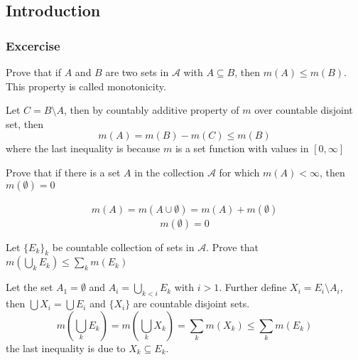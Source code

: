 \subsection{Introduction}
\subsubsection{Excercise}

\begin{exercise}{1}
    Prove that if $A$ and $B$ are two sets in $\mathcal A$ with $A \subseteq B$, then $m(A) \leq m(B)$. This property is called monotonicity.
\end{exercise}
\begin{solution}
Let $C = B \setminus A$, then by countably additive property of $m$ over countable disjoint set, then
\[m(A) = m(B) - m(C) \leq m(B)\]
where the last inequality is because $m$ is a set function with values in $[0, \infty]$
\end{solution} 
 
\begin{exercise}{2} 
Prove that if there is a set $A$ in the collection $\mathcal A$ for which $m(A) < \infty$, then $m(\emptyset)= 0$
\end{exercise}

\begin{solution}
    \begin{align*}
        m(A) = m(A \cup \emptyset) = m(A) + m(\emptyset)
    \end{align*}
    \begin{equation*}
        m(\emptyset) = 0
    \end{equation*}
\end{solution}

\begin{exercise}{3}
Let $\{E_k\}_k$ be countable collection of sets in $\mathcal A$. Prove that $m(\bigcup_k E_k) \leq \sum_k m(E_k)$
\end{exercise}

\begin{solution}
    Let the set $A_1 = \emptyset$ and $A_i = \bigcup_{k < i} E_k$ with $i > 1$. Further define $X_i = E_i \setminus A_i $, then 
    $\bigcup X_i = \bigcup E_i$ and $\{X_i\}$ are countable disjoint sets. 
    \begin{equation*}
        m(\bigcup_k E_k) = m(\bigcup_k X_k) = \sum_k m(X_k) \leq \sum_k m(E_k)
    \end{equation*}
    the last inequality is due to $X_k \subseteq E_k$.
\end{solution}

